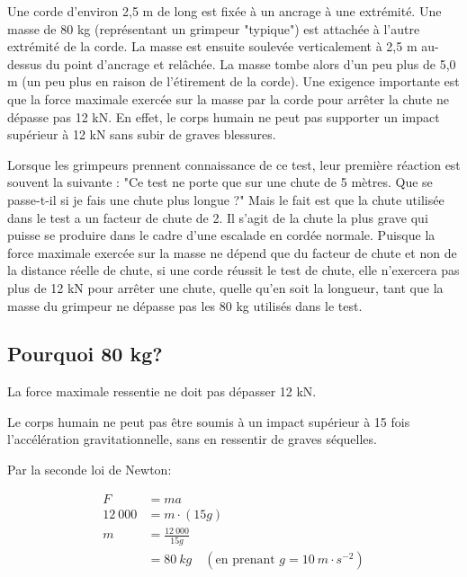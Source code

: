 \documentclass[a4paper,10pt,french]{scrartcl}
\begin{document}
Une corde d'environ 2,5 m de long est fixée à un ancrage à une extrémité. Une masse de 80 kg (représentant un grimpeur "typique") est attachée à l'autre extrémité de la corde. La masse est ensuite soulevée verticalement à 2,5 m au-dessus du point d'ancrage et relâchée. La masse tombe alors d'un peu plus de 5,0 m (un peu plus en raison de l'étirement de la corde).
Une exigence importante est que la force maximale exercée sur la masse par la corde pour arrêter la chute ne dépasse pas 12 kN. En effet, le corps humain ne peut pas supporter un impact supérieur à 12 kN sans subir de graves blessures.

Lorsque les grimpeurs prennent connaissance de ce test, leur première réaction est souvent la suivante : "Ce test ne porte que sur une chute de 5 mètres. Que se passe-t-il si je fais une chute plus longue ?" Mais le fait est que la chute utilisée dans le test a un facteur de chute de 2. Il s'agit de la chute la plus grave qui puisse se produire dans le cadre d'une escalade en cordée normale. Puisque la force maximale exercée sur la masse ne dépend que du facteur de chute et non de la distance réelle de chute, si une corde réussit le test de chute, elle n'exercera pas plus de 12 kN pour arrêter une chute, quelle qu'en soit la longueur, tant que la masse du grimpeur ne dépasse pas les 80 kg utilisés dans le test.


\subsection{Pourquoi 80 kg?}

La force maximale ressentie ne doit pas dépasser 12 kN.

Le corps humain ne peut pas être soumis à un impact supérieur à 15 fois l'accélération gravitationnelle, sans en ressentir de graves séquelles.

Par la seconde loi de Newton:

\[
\begin{aligned}
F &= ma \\
12\ 000 &= m\cdot (15g) \\
m &= \frac{12\ 000}{15g} \\
&= 80\ kg \quad (\text{en prenant } g=10 \ m\cdot s^{-2})
\end{aligned}
\]


\end{document}

